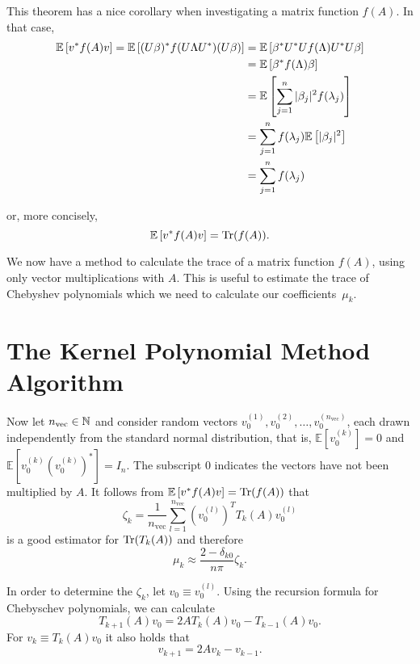 This theorem has a nice corollary when investigating a matrix function $f(A)$.
In that case,
\begin{align*}
    \mathbb{E}\left[v^* f(A) v\right] = \mathbb{E}\left[(U\beta)^* f(U\Lambda U^*) (U\beta)\right] &= \mathbb{E}\left[\beta^* U^* U f(\Lambda) U^* U \beta\right] \\
    &= \mathbb{E}\left[\beta^* f(\Lambda) \beta\right] \\
    &= \mathbb{E}\left[\sum_{j = 1}^n |\beta_j|^2 f(\lambda_j) \right] \\
    &= \sum_{j = 1}^n f(\lambda_j) \mathbb{E}\left[ |\beta_j|^2 \right] \\
    &= \sum_{j = 1}^n f(\lambda_j)
\end{align*}

or, more concisely,
\[
    \mathbb{E}\left[v^* f(A) v\right] = \operatorname{Tr}(f(A)).
\]

We now have a method to calculate the trace of a matrix function $f(A)$, using only vector multiplications with $A$. This is useful to estimate the trace of Chebyshev polynomials which we need to calculate our coefficients~$\mu_k$.

\section{The Kernel Polynomial Method Algorithm}

Now let $n_{\text{vec}} \in \mathbb{N}$ and consider random vectors $v_0^{(1)}, v_0^{(2)}, \dots, v_0^{(n_{\text{vec}})}$, each drawn independently from the standard normal distribution, that is, $\mathbb{E}[v_0^{(k)}] = 0$ and $\mathbb{E}\left[v_0^{(k)} \left(v_0^{(k)}\right)^*\right] = I_n$. The subscript $0$ indicates the vectors have not been multiplied by $A$. It follows from $\mathbb{E}\left[v^* f(A) v\right] = \operatorname{Tr}(f(A))$ that
\[
\zeta_k = \frac{1}{n_{\text{vec}}} \sum_{l = 1}^{n_{\text{vec}}} \left( v_0^{(l)} \right)^T T_k(A) v_0^{(l)}
\]
is a good estimator for $\operatorname{Tr}(T_k(A))$ and therefore
\[
\mu_k \approx \frac{2 - \delta_{k0}}{n \pi} \zeta_k.
\]

In order to determine the $\zeta_k$, let $v_0 \equiv v_0^{(l)}$.
Using the recursion formula for Chebyschev polynomials, we can calculate
\[
T_{k + 1}(A)v_0 = 2 A T_k(A) v_0 - T_{k - 1}(A) v_0.
\]
For $v_k \equiv T_k(A)v_0$ it also holds that
\[
v_{k + 1} = 2 A v_k - v_{k - 1}.
\]

